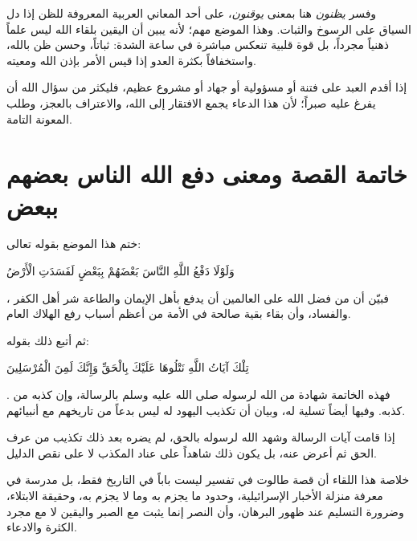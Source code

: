 وفسر  \textit{يظنون} هنا بمعنى \textit{يوقنون}، على أحد المعاني العربية المعروفة للظن إذا دل السياق على الرسوخ والثبات. وهذا الموضع مهم؛ لأنه يبين أن اليقين بلقاء الله ليس علماً ذهنياً مجرداً، بل قوة قلبية تنعكس مباشرة في ساعة الشدة: ثباتاً، وحسن ظن بالله، واستخفافاً بكثرة العدو إذا قيس الأمر بإذن الله ومعيته.

\begin{fawaid}
إذا أقدم العبد على فتنة أو مسؤولية أو جهاد أو مشروع عظيم، فليكثر من سؤال الله أن يفرغ عليه صبراً؛ لأن هذا الدعاء يجمع الافتقار إلى الله، والاعتراف بالعجز، وطلب المعونة التامة.
\end{fawaid}

\section{خاتمة القصة ومعنى دفع الله الناس بعضهم ببعض}
ختم  هذا الموضع بقوله تعالى: \begin{ayah}وَلَوْلَا دَفْعُ اللَّهِ النَّاسَ بَعْضَهُمْ بِبَعْضٍ لَفَسَدَتِ الْأَرْضُ\end{ayah}، فبيّن أن من فضل الله على العالمين أن يدفع بأهل الإيمان والطاعة شر أهل الكفر والفساد، وأن بقاء بقية صالحة في الأمة من أعظم أسباب رفع الهلاك العام.

ثم أتبع ذلك بقوله: \begin{ayah}تِلْكَ آيَاتُ اللَّهِ نَتْلُوهَا عَلَيْكَ بِالْحَقِّ وَإِنَّكَ لَمِنَ الْمُرْسَلِينَ\end{ayah}. فهذه الخاتمة شهادة من الله لرسوله صلى الله عليه وسلم بالرسالة، وإن كذبه من كذبه. وفيها أيضاً تسلية له، وبيان أن تكذيب اليهود له ليس بدعاً من تاريخهم مع أنبيائهم.

\begin{fawaid}
إذا قامت آيات الرسالة وشهد الله لرسوله بالحق، لم يضره بعد ذلك تكذيب من عرف الحق ثم أعرض عنه، بل يكون ذلك شاهداً على عناد المكذب لا على نقص الدليل.
\end{fawaid}

\separator

خلاصة هذا اللقاء أن قصة طالوت في تفسير  ليست باباً في التاريخ فقط، بل مدرسة في معرفة منزلة الأخبار الإسرائيلية، وحدود ما يجزم به وما لا يجزم به، وحقيقة الابتلاء، وضرورة التسليم عند ظهور البرهان، وأن النصر إنما يثبت مع الصبر واليقين لا مع مجرد الكثرة والادعاء.
